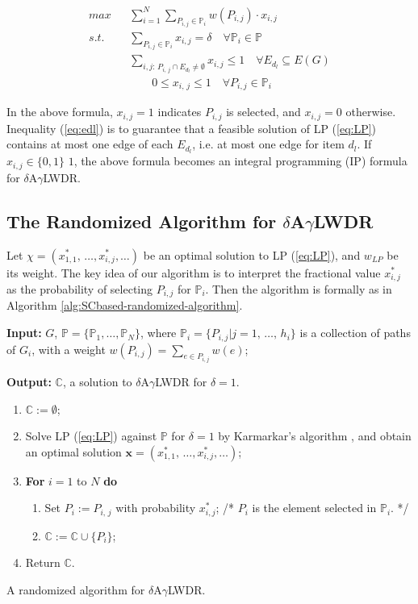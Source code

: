 \documentclass[11pt,english,onecolumn,draftcls]{IEEEtran}
\theoremstyle{plain}
\theoremstyle{plain}
\theoremstyle{plain}
\theoremstyle{plain}
\begin{document}
\begin{eqnarray}
max &  & \sum_{i=1}^{N}\sum_{P_{i,j}\in\mathbb{P}_{i}}w(P_{i,j})\cdot x_{i,j}\label{eq:LP}\\
s.t. &  & \sum_{P_{i,j}\in\mathbb{P}_{i}}x_{i,j}=\delta\quad\forall\mathbb{P}_{i}\in\mathbb{P}\label{eq:unimoforSC}\\
 &  & \sum_{i,j:\, P_{i,\, j}\cap E_{d_{l}}\neq\emptyset}x_{i,j}\leq1\quad\forall E_{d_{l}}\subseteq E(G)\label{eq:edl}\\
 &  & \quad\quad0\leq x_{i,\, j}\leq1\quad\forall P_{i,j}\in\mathbb{P}_{i}
\end{eqnarray}


In the above formula, $x_{i,j}=1$ indicates $P_{i,j}$ is selected,
and $x_{i,j}=0$ otherwise. Inequality (\ref{eq:edl}) is to guarantee
that a feasible solution of LP (\ref{eq:LP}) contains at most one
edge of each $E_{d_{l}}$, i.e. at most one edge for item $d_{l}$.
If $x_{i,j}\in\{0,1\}$ $1$, the above formula becomes an integral
programming (IP) formula for $\delta$A$\gamma$LWDR.


\subsection{The Randomized Algorithm for $\delta$A$\gamma$LWDR }

Let $\chi=(x_{1,1}^{*},\,\dots,x_{i,j}^{*},\dots)$ be an optimal
solution to LP (\ref{eq:LP}), and $w_{LP}$ be its weight. The key
idea of our algorithm is to interpret the fractional value $x_{i,j}^{*}$
as the probability of selecting $P_{i,j}$ for $\mathbb{P}_{i}$.
Then the algorithm is formally as in Algorithm \ref{alg:SCbased-randomized-algorithm}.

\begin{algorithm}
\textbf{Input: }$G$, $\mathbb{P}=\{\mathbb{P}_{1},\dots,\mathbb{P}_{N}\}$,
where $\mathbb{P}_{i}=\{P_{i,j}\vert j=1,\,\dots,\, h_{i}\}$ is a
collection of paths of $G_{i}$, with a weight $w(P_{i,j})=\sum_{e\in P_{i,j}}w(e)$;

\textbf{Output:} $\mathbb{C}$, a solution to $\delta$A$\gamma$LWDR
for $\delta=1$.
\begin{enumerate}
\item $\mathbb{C}:=\emptyset$;
\item Solve LP (\ref{eq:LP}) against $\mathbb{P}$ for $\delta=1$ by Karmarkar's
algorithm \cite{schrijver1998theory}, and obtain an optimal solution
$\mathbf{x}=(x_{1,1}^{*},\,\dots,x_{i,j}^{*},\dots)$;
\item \textbf{For} $i=1$ to $N$ \textbf{do }

\begin{enumerate}
\item Set $P_{i}:=P_{i,\, j}$ with probability $x_{i,j}^{*}$; /{*} $P_{i}$
is the element selected in $\mathbb{P}_{i}$. {*}/
\item $\mathbb{C}:=\mathbb{C}\cup\{P_{i}\}$;
\end{enumerate}
\item Return $\mathbb{C}$.
\end{enumerate}
\protect\caption{\label{alg:SCbased-randomized-algorithm}A randomized algorithm for
$\delta$A$\gamma$LWDR.}
\end{algorithm}
\end{document}
